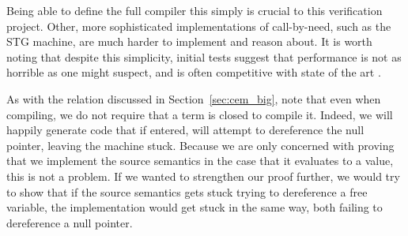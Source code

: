 Being able to define the full compiler this simply is crucial to this
verification project. Other, more sophisticated implementations of call-by-need,
such as the STG machine, are much harder to implement and reason about. It is
worth noting that despite this simplicity, initial tests suggest that performance
is not as horrible as one might suspect, and is often competitive with state of
the art \cite{cem}.

As with the relation discussed in Section~\ref{sec:cem_big}, note that even when
compiling, we do not require that a term is closed to compile it. Indeed, we
will happily generate code that if entered, will attempt to dereference the null
pointer, leaving the machine stuck. Because we are only concerned with proving
that we implement the source semantics in the case that it evaluates to a value,
this is not a problem. If we wanted to strengthen our proof further, we would
try to show that if the source semantics gets stuck trying to dereference a free
variable, the implementation would get stuck in the same way, both failing to
dereference a null pointer.    
